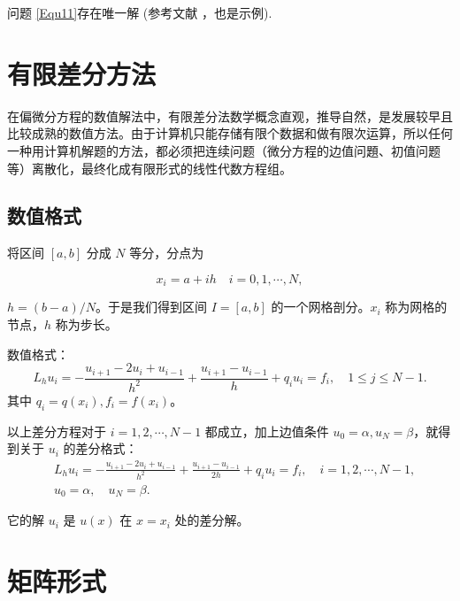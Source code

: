 \documentclass{shnuthesis}
\begin{document}
问题 \eqref{Equ11}存在唯一解 (参考文献 \cite{Tadmor2012}，也是示例).


\section{有限差分方法}
在偏微分方程的数值解法中，有限差分法数学概念直观，推导自然，是发展较早且比较成熟的数值方法。由于计算机只能存储有限个数据和做有限次运算，所以任何一种用计算机解题的方法，都必须把连续问题（微分方程的边值问題、初值问题等）离散化，最终化成有限形式的线性代数方程组。


\subsection{数值格式}
将区间 $[a,b]$ 分成 $N$ 等分，分点为

$$x_{i}=a+i h \quad i=0,1, \cdots, N,$$

$h=(b-a) / N$。于是我们得到区间 $I=[a,b]$ 的一个网格剖分。$x_i$ 称为网格的节点，$h$ 称为步长。

数值格式：
$$L_{h} u_{i}=-\frac{u_{i+1}-2 u_{i}+u_{i-1}}{h^{2}}+\frac{u_{i+1}-u_{i-1}}{h}+q_{i} u_{i}=f_{i},\quad 1 \leqslant j \leqslant N-1.$$
其中  $q_{i}=q(x_{i}), f_{i}=f(x_{i})$。

以上差分方程对于 $i=1,2, \cdots, N-1$ 都成立，加上边值条件 $u_{0}=\alpha, u_{N}=\beta$，就得到关于 $u_i$ 的差分格式：
$$\begin{aligned}
& L_{h} u_{i}=-\frac{u_{i+1}-2 u_{i}+u_{i-1}}{h^{2}}+\frac{u_{i+1}-u_{i-1}}{2h}+q_{i} u_{i}=f_{i}, \quad i=1,2, \cdots, N-1, \\
& u_{0}=\alpha, \quad u_{N}=\beta.
\end{aligned}$$

它的解 $u_i$ 是 $u(x)$ 在 $x=x_i$ 处的差分解。



\section{矩阵形式}
\end{document}
